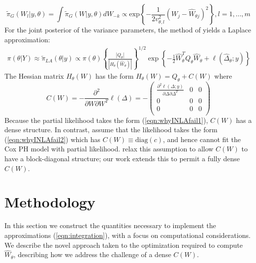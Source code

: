 \documentclass[]{article}
\begin{document}
\begin{equation}\label{eqb:marginalgaussianapprox}
\tilde{\pi}_{G}(W_{l}|y,\theta) = \int\tilde{\pi}_{G}(W|y,\theta)dW_{-k} \propto\text{exp}\left\{-\frac{1}{2v_{\theta,l}^{2}} \left(W_j-\widehat{W}_{\theta j} \right)^2 \right\}, l = 1,\ldots,m
\end{equation}
For the joint posterior of the variance parameters, the method of \citet{tierney} yields a Laplace approximation:
\begin{equation}\begin{aligned}\label{eqn:laplace}
\pi(\theta|Y) \approx \tilde{\pi}_{LA}(\theta|y) \propto \pi(\theta)\left\{\frac{\left|Q_{\theta}\right|}{\left|H_{\theta}\left(\widehat{W}_{\theta}\right)\right|}\right\}^{1/2}\exp\left\{ -\frac{1}{2}\widehat{W}_{\theta}^{T}Q_{\theta}\widehat{W}_{\theta} + \ell\left(\widehat{\Delta}_{\theta};y \right)\right\}
\end{aligned}\end{equation}
The Hessian matrix $H_{\theta}(W)$ has the form $H_{\theta}(W) = Q_{\theta} + C(W)$ where
\begin{equation*}
C(W) = -\frac{\partial^{2}}{\partial W\partial W^{T}}\ell(\Delta) = -\begin{pmatrix}
\frac{\partial^{2}\ell(\Delta;y)}{\partial\Delta\partial\Delta^{T}} & 0 & 0 \\
0 & 0 & 0 \\
0 & 0 & 0 \\
\end{pmatrix}
\end{equation*}
Because the partial likelihood takes the form (\ref{eqn:whyINLAfail1}), $C(W)$ has a dense structure. In contrast, \citet{inla} assume that the likelihood takes the form (\ref{eqn:whyINLAfail2}) which has $C(W) \equiv \text{diag}(c)$, and hence cannot fit the Cox PH model with partial likelihood. \citet{casecross} relax this assumption to allow $C(W)$ to have a block-diagonal structure; our work extends this to permit a fully dense $C(W)$. 

\section{Methodology}\label{sec:method}

In this section we construct the quantities necessary to implement the approximations (\ref{eqn:integration}), with a focus on computational considerations. We describe the novel approach taken to the optimization required to compute $\widehat{W}_{\theta}$, describing how we address the challenge of a dense $C(W)$.
\end{document}
